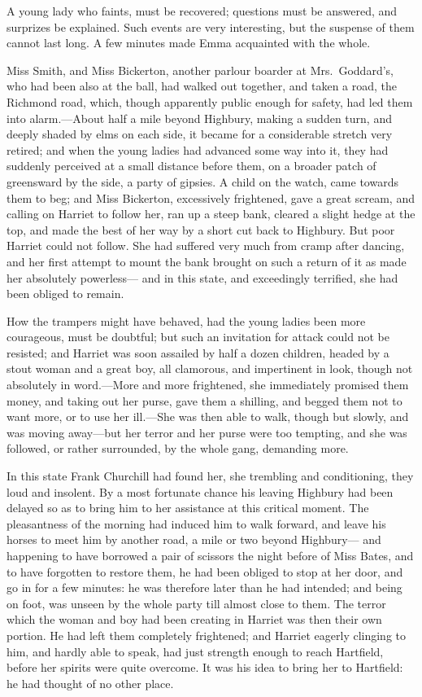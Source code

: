A young lady who faints, must be recovered; questions must be answered,
and surprizes be explained.  Such events are very interesting,
but the suspense of them cannot last long.  A few minutes made Emma
acquainted with the whole.

Miss Smith, and Miss Bickerton, another parlour boarder at
Mrs.\ Goddard's, who had been also at the ball, had walked out together,
and taken a road, the Richmond road, which, though apparently public
enough for safety, had led them into alarm.---About half a mile
beyond Highbury, making a sudden turn, and deeply shaded by elms
on each side, it became for a considerable stretch very retired;
and when the young ladies had advanced some way into it,
they had suddenly perceived at a small distance before them,
on a broader patch of greensward by the side, a party of gipsies.
A child on the watch, came towards them to beg; and Miss Bickerton,
excessively frightened, gave a great scream, and calling on Harriet
to follow her, ran up a steep bank, cleared a slight hedge at the top,
and made the best of her way by a short cut back to Highbury.
But poor Harriet could not follow.  She had suffered very much
from cramp after dancing, and her first attempt to mount the bank
brought on such a return of it as made her absolutely powerless---%
and in this state, and exceedingly terrified, she had been obliged
to remain.

How the trampers might have behaved, had the young ladies been
more courageous, must be doubtful; but such an invitation for attack
could not be resisted; and Harriet was soon assailed by half a
dozen children, headed by a stout woman and a great boy, all clamorous,
and impertinent in look, though not absolutely in word.---More and
more frightened, she immediately promised them money, and taking out
her purse, gave them a shilling, and begged them not to want more,
or to use her ill.---She was then able to walk, though but slowly,
and was moving away---but her terror and her purse were too tempting,
and she was followed, or rather surrounded, by the whole gang,
demanding more.

In this state Frank Churchill had found her, she trembling
and conditioning, they loud and insolent.  By a most fortunate
chance his leaving Highbury had been delayed so as to bring him
to her assistance at this critical moment.  The pleasantness
of the morning had induced him to walk forward, and leave his
horses to meet him by another road, a mile or two beyond Highbury---%
and happening to have borrowed a pair of scissors the night before
of Miss Bates, and to have forgotten to restore them, he had
been obliged to stop at her door, and go in for a few minutes:
he was therefore later than he had intended; and being on foot,
was unseen by the whole party till almost close to them.
The terror which the woman and boy had been creating in Harriet
was then their own portion.  He had left them completely frightened;
and Harriet eagerly clinging to him, and hardly able to speak,
had just strength enough to reach Hartfield, before her spirits
were quite overcome.  It was his idea to bring her to Hartfield:
he had thought of no other place.


